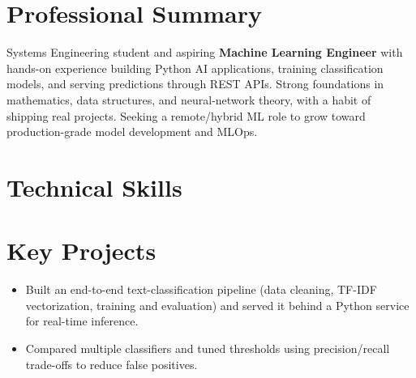 \documentclass[10pt]{article}
\begin{document}

\section{Professional Summary}
Systems Engineering student and aspiring \textbf{Machine Learning Engineer} with hands-on
experience building Python AI applications, training classification models, and serving
predictions through REST APIs. Strong foundations in mathematics, data structures, and
neural-network theory, with a habit of shipping real projects. Seeking a remote/hybrid ML
role to grow toward production-grade model development and MLOps.

\section{Technical Skills}

\section{Key Projects}

\begin{itemize}
  \item Built an end-to-end text-classification pipeline (data cleaning, TF-IDF vectorization, training and evaluation) and served it behind a Python service for real-time inference.
  \item Compared multiple classifiers and tuned thresholds using precision/recall trade-offs to reduce false positives.
\end{itemize}
\end{document}
